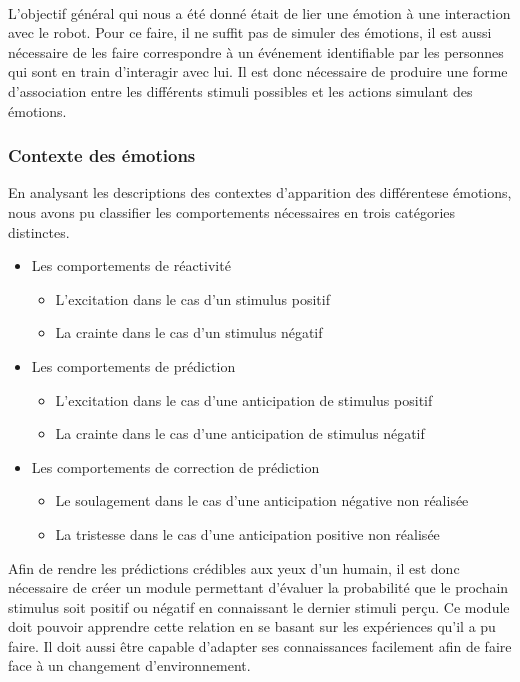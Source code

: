 \paragraph{}
L'objectif général qui nous a été donné était de lier une émotion à une
interaction avec le robot. Pour ce faire, il ne suffit pas de simuler des
émotions, il est aussi nécessaire de les faire correspondre à un événement
identifiable par les personnes qui sont en train d'interagir avec lui. Il est
donc nécessaire de produire une forme d'association entre les différents
stimuli possibles et les actions simulant des émotions.

\subsubsection{Contexte des émotions}
En analysant les descriptions des contextes d'apparition des différentese
émotions, nous avons pu classifier les comportements nécessaires en trois
catégories distinctes.
\begin{itemize}
\item Les comportements de réactivité
      \begin{itemize}
      \item L'excitation dans le cas d'un stimulus positif
      \item La crainte dans le cas d'un stimulus négatif
      \end{itemize}
\item Les comportements de prédiction
      \begin{itemize}
      \item L'excitation dans le cas d'une anticipation de stimulus positif
      \item La crainte dans le cas d'une anticipation de stimulus négatif
      \end{itemize}
\item Les comportements de correction de prédiction
      \begin{itemize}
      \item Le soulagement dans le cas d'une anticipation négative non réalisée
      \item La tristesse dans le cas d'une anticipation positive non réalisée
      \end{itemize}
\end{itemize}

Afin de rendre les prédictions crédibles aux yeux d'un humain, il est
donc nécessaire de créer un module permettant d'évaluer la probabilité que le
prochain stimulus soit positif ou négatif en connaissant le dernier stimuli
perçu. Ce module doit pouvoir apprendre cette relation en se basant sur les
expériences qu'il a pu faire. Il doit aussi être capable d'adapter ses
connaissances facilement afin de faire face à un changement d'environnement.

